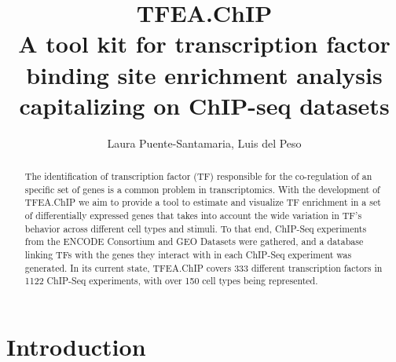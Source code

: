 \documentclass[a4paper, 12pt ]{article}
\author{Laura Puente-Santamaria, Luis del Peso}
\title{TFEA.ChIP\\\large A tool kit for transcription factor binding site enrichment analysis capitalizing on ChIP-seq datasets}
\begin{document}
	\maketitle
\begin{abstract}

The identification of transcription factor (TF) responsible for the co-regulation of an specific set of genes is a common problem in transcriptomics. With the development of TFEA.ChIP we aim to provide a tool to estimate and visualize TF enrichment in a set of differentially expressed genes that takes into account the wide variation in TF's behavior across different cell types and stimuli. To that end, ChIP-Seq experiments from the ENCODE Consortium and GEO Datasets were gathered, and a database linking TFs with the genes they interact with in each ChIP-Seq experiment was generated. In its current state, TFEA.ChIP covers 333 different transcription factors in 1122 ChIP-Seq experiments, with over 150 cell types being represented.

\end{abstract}

\section{Introduction}
\end{document}
